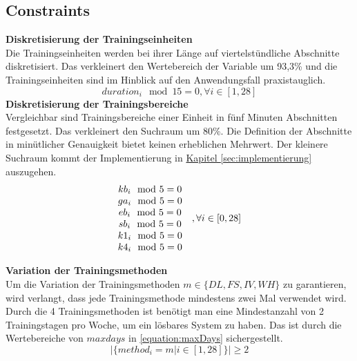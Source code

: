 \subsection{Constraints}
\textbf{Diskretisierung der Trainingseinheiten} \\[0.2em]
Die Trainingseinheiten werden bei ihrer Länge auf viertelstündliche Abschnitte diskretisiert. Das verkleinert den Wertebereich der Variable um 93,3\% und die Trainingseinheiten sind im Hinblick auf den Anwendungsfall praxistauglich.
\begin{equation}
    {duration}_i \mod 15 = 0 , \forall i \in [1, 28]
\end{equation} 
\textbf{Diskretisierung der Trainingsbereiche} \\[0.2em]
Vergleichbar sind Trainingsbereiche einer Einheit in fünf Minuten Abschnitten festgesetzt. Das verkleinert den Suchraum um 80\%. Die Definition der Abschnitte in minütlicher Genauigkeit bietet keinen erheblichen Mehrwert. Der kleinere
Suchraum kommt der Implementierung in \hyperref[sec:implementierung]{Kapitel \ref{sec:implementierung}} auszugehen.
\begin{equation}
\begin{array}{cc}
    kb_i \mod 5 = 0 & \multirow{6}{*}{$, \forall i \in [0, 28]$} \\
    ga_i \mod 5 = 0 & \\ 
    eb_i \mod 5 = 0 & \\ 
    sb_i \mod 5 = 0 & \\ 
    k1_i \mod 5 = 0 & \\ 
    k4_i \mod 5 = 0 & \\
\end{array}
\end{equation}

\textbf{Variation der Trainingsmethoden} \\[0.2em]
Um die Variation der Trainingsmethoden $m \in \{DL, FS, IV, WH\}$ zu garantieren, wird verlangt, dass jede Trainingsmethode mindestens zwei Mal verwendet wird. Durch die 4 Trainingsmethoden ist benötigt man eine Mindestanzahl von 2 Trainingstagen pro Woche, um ein lösbares System zu haben. Das ist durch die Wertebereiche von $maxdays$ in \ref{equation:maxDays} sichergestellt.
\begin{equation} 
    |\{method_i = m | i \in [1, 28]\}| \geq 2
\end{equation} 

